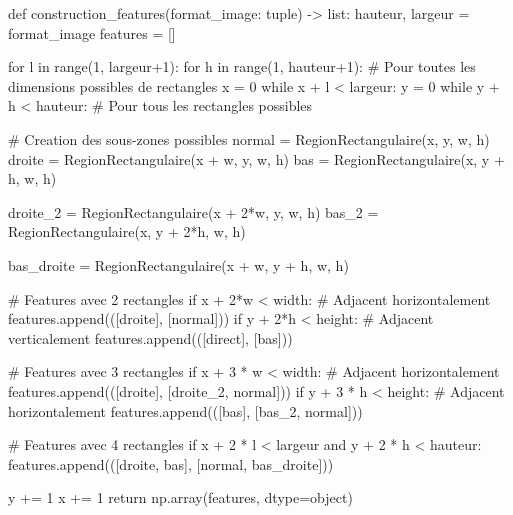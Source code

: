 \documentclass[12pt,a4paper]{article}
\begin{document}
\begin{python}
def construction_features(format_image: tuple) -> list:
    hauteur, largeur = format_image
    features = []

    for l in range(1, largeur+1):
        for h in range(1, hauteur+1):
            # Pour toutes les dimensions possibles de rectangles
            x = 0
            while x + l < largeur:
                y = 0
                while y + h < hauteur:
                    # Pour tous les rectangles possibles
                    
                    # Creation des sous-zones possibles
                    normal = RegionRectangulaire(x, y, w, h)
                    droite = RegionRectangulaire(x + w, y, w, h)
                    bas = RegionRectangulaire(x, y + h, w, h)

                    droite_2 = RegionRectangulaire(x + 2*w, y, w, h)
                    bas_2 = RegionRectangulaire(x, y + 2*h, w, h)

                    bas_droite = RegionRectangulaire(x + w, y + h, w, h)

                    # Features avec 2 rectangles
                    if x + 2*w < width: # Adjacent horizontalement
                        features.append(([droite], [normal]))
                    if y + 2*h < height: # Adjacent verticalement
                        features.append(([direct], [bas]))

                    # Features avec 3 rectangles
                    if x + 3 * w < width: # Adjacent horizontalement
                        features.append(([droite], [droite_2, normal]))
                    if y + 3 * h < height: # Adjacent horizontalement
                        features.append(([bas], [bas_2, normal]))

                    # Features avec 4 rectangles
                    if x + 2 * l < largeur and y + 2 * h < hauteur:
                        features.append(([droite, bas], [normal, bas_droite]))

                    y += 1
                x += 1
    return np.array(features, dtype=object)
\end{python}
\end{document}
